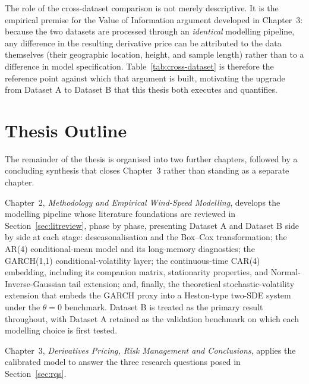 ﻿\documentclass[11pt, a4paper, twoside]{article}
\begin{document}
The role of the cross-dataset comparison is not merely descriptive. It is the empirical premise for the Value of Information argument developed in Chapter~3: because the two datasets are processed through an \emph{identical} modelling pipeline, any difference in the resulting derivative price can be attributed to the data themselves (their geographic location, height, and sample length) rather than to a difference in model specification. Table~\ref{tab:cross-dataset} is therefore the reference point against which that argument is built, motivating the upgrade from Dataset A to Dataset B that this thesis both executes and quantifies.

\section{Thesis Outline}
\label{sec:outline}

The remainder of the thesis is organised into two further chapters, followed by a concluding synthesis that closes Chapter~3 rather than standing as a separate chapter.

Chapter~2, \emph{Methodology and Empirical Wind-Speed Modelling}, develops the modelling pipeline whose literature foundations are reviewed in Section~\ref{sec:litreview}, phase by phase, presenting Dataset A and Dataset B side by side at each stage: deseasonalisation and the Box--Cox transformation; the AR(4) conditional-mean model and its long-memory diagnostics; the GARCH(1,1) conditional-volatility layer; the continuous-time CAR(4) embedding, including its companion matrix, stationarity properties, and Normal-Inverse-Gaussian tail extension; and, finally, the theoretical stochastic-volatility extension that embeds the GARCH proxy into a Heston-type two-SDE system under the $\theta = 0$ benchmark. Dataset B is treated as the primary result throughout, with Dataset A retained as the validation benchmark on which each modelling choice is first tested.

Chapter~3, \emph{Derivatives Pricing, Risk Management and Conclusions}, applies the calibrated model to answer the three research questions posed in Section~\ref{sec:rqs}.
\end{document}
